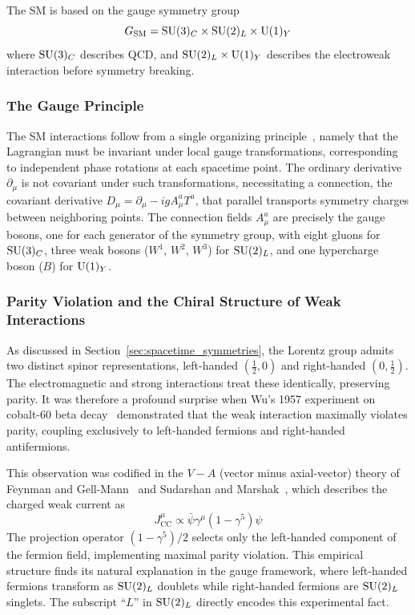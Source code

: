 The SM is based on the gauge symmetry group
\begin{equation}
G_{\text{SM}} = \mathrm{SU}(3)_C \times \mathrm{SU}(2)_L \times \mathrm{U}(1)_Y
\end{equation}
where $\mathrm{SU}(3)_C$ describes QCD, and $\mathrm{SU}(2)_L \times \mathrm{U}(1)_Y$ describes the electroweak interaction before symmetry breaking.

\subsubsection{The Gauge Principle}

The SM interactions follow from a single organizing principle~\cite{Yang:1954ek}, namely that the Lagrangian must be invariant under local gauge transformations, corresponding to independent phase rotations at each spacetime point. The ordinary derivative $\partial_\mu$ is not covariant under such transformations, necessitating a connection, the covariant derivative $D_\mu = \partial_\mu - igA_\mu^a T^a$, that parallel transports symmetry charges between neighboring points. The connection fields $A_\mu^a$ are precisely the gauge bosons, one for each generator of the symmetry group, with eight gluons for $\mathrm{SU}(3)_C$, three weak bosons ($W^1$, $W^2$, $W^3$) for $\mathrm{SU}(2)_L$, and one hypercharge boson ($B$) for $\mathrm{U}(1)_Y$.

\subsubsection{Parity Violation and the Chiral Structure of Weak Interactions}

As discussed in Section~\ref{sec:spacetime_symmetries}, the Lorentz group admits two distinct spinor representations, left-handed $(\frac{1}{2}, 0)$ and right-handed $(0, \frac{1}{2})$. The electromagnetic and strong interactions treat these identically, preserving parity. It was therefore a profound surprise when Wu's 1957 experiment on cobalt-60 beta decay~\cite{Wu:1957my} demonstrated that the weak interaction maximally violates parity, coupling exclusively to left-handed fermions and right-handed antifermions.

This observation was codified in the $V{-}A$ (vector minus axial-vector) theory of Feynman and Gell-Mann~\cite{Feynman:1958ty} and Sudarshan and Marshak~\cite{Sudarshan:1958vf}, which describes the charged weak current as
\begin{equation}
J^\mu_{\text{CC}} \propto \bar{\psi}\gamma^\mu(1 - \gamma^5)\psi
\end{equation}
The projection operator $(1 - \gamma^5)/2$ selects only the left-handed component of the fermion field, implementing maximal parity violation. This empirical structure finds its natural explanation in the gauge framework, where left-handed fermions transform as $\mathrm{SU}(2)_L$ doublets while right-handed fermions are $\mathrm{SU}(2)_L$ singlets. The subscript ``$L$'' in $\mathrm{SU}(2)_L$ directly encodes this experimental fact.

